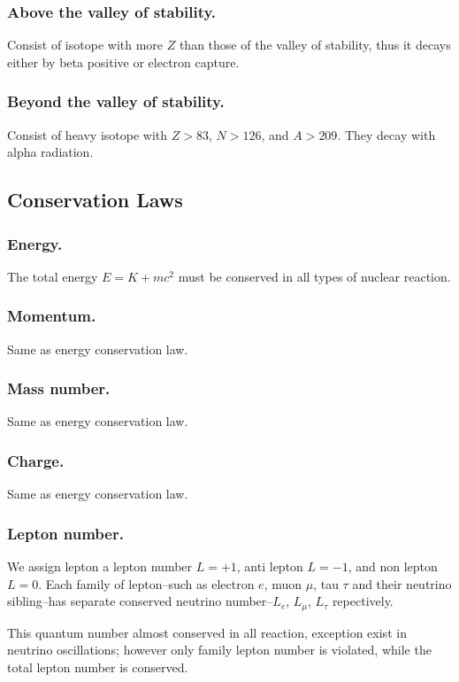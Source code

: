 \documentclass[../../../main.tex]{subfiles}
\begin{document}
\subsubsection*{Above the valley of stability.} Consist of isotope with more $Z$ than those of the valley of stability, thus it decays either by beta positive or electron capture.

\subsubsection*{Beyond the valley of stability.}  Consist of heavy isotope with $Z>83$, $N>126$, and $A>209$. They decay with alpha radiation.

\subsection*{Conservation Laws}
\subsubsection*{Energy.} The total energy $E=K+mc^2$ must be conserved in all types of nuclear reaction.

\subsubsection*{Momentum.} Same as energy conservation law.

\subsubsection*{Mass number.} Same as energy conservation law.

\subsubsection*{Charge.} Same as energy conservation law.

\subsubsection*{Lepton number.} We assign lepton a lepton number $L=+1$, anti lepton $L=-1$, and non lepton $L=0$. Each family of lepton--such as electron $e$, muon $\mu$, tau $\tau$ and their neutrino sibling--has separate conserved neutrino number--$L_e$, $L_\mu$, $L_\tau$ repectively.

This quantum number almost conserved in all reaction, exception exist in neutrino oscillations; however only family lepton number is violated, while the total lepton number is conserved.
\end{document}
